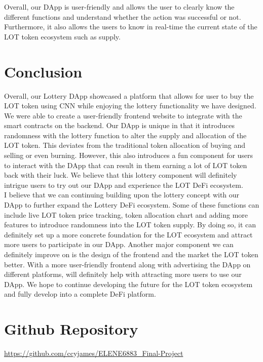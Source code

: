 \documentclass[11pt]{article}
\begin{document}
Overall, our DApp is user-friendly and allows the user to clearly know the different functions and understand whether the action was successful or not. Furthermore, it also allows the users to know in real-time the current state of the LOT token ecosystem such as supply.
\section*{Conclusion}
Overall, our Lottery DApp showcased a platform that allows for user to buy the LOT token using CNN while enjoying the lottery functionality we have designed. We were able to create a user-friendly frontend website to integrate with the smart contracts on the backend. Our DApp is unique in that it introduces randomness with the lottery function to alter the supply and allocation of the LOT token. This deviates from the traditional token allocation of buying and selling or even burning. However, this also introduces a fun component for users to interact with the DApp that can result in them earning a lot of LOT token back with their luck. We believe that this lottery component will definitely intrigue users to try out our DApp and experience the LOT DeFi ecosystem.\\
I believe that we can continuing building upon the lottery concept with our DApp to further expand the Lottery DeFi ecosystem. Some of these functions can include live LOT token price tracking, token allocation chart and adding more features to introduce randomness into the LOT token supply. By doing so, it can definitely set up a more concrete foundation for the LOT ecosystem and attract more users to participate in our DApp. Another major component we can definitely improve on is the design of the frontend and the market the LOT token better. With a more user-friendly frontend along with advertising the DApp on different platforms, will definitely help with attracting more users to use our DApp. We hope to continue developing the future for the LOT token ecosystem and fully develop into a complete DeFi platform.

\newpage
\section*{Github Repository}
\url{https://github.com/ccyjames/ELENE6883_Final-Project}
\printbibliography[title = References]
\end{document}
